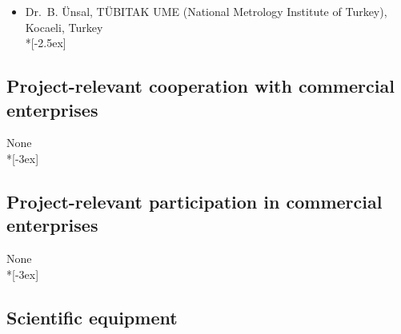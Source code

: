 \documentclass[11pt,a4paper,twoside]{scrartcl}
\begin{document}
\begin{itemize}
    	\item  Dr.\ B. \"Unsal, T\"UBITAK UME (National Metrology Institute of 
    	Turkey), Kocaeli, Turkey\\*[-2.5ex]		
	
\end{itemize}



\subsection{Project-relevant cooperation with commercial enterprises}

\qquad \quad None \\*[-3ex]


\subsection{Project-relevant participation in commercial enterprises}

\qquad \quad None \\*[-3ex]

\subsection{Scientific equipment}
\end{document}
